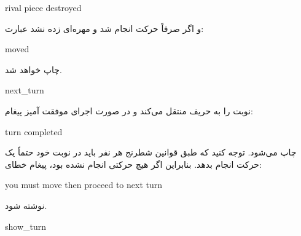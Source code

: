 \documentclass[]{article}
\begin{document}
\begin{tcolorbox}[boxrule=0pt]
	\begin{latin}
  	  \large{
  	  	rival piece destroyed
		}
	\end{latin}
\end{tcolorbox}

و اگر صرفاً حرکت انجام شد و مهره‌ای زده نشد عبارت:


\begin{tcolorbox}[boxrule=0pt]
	\begin{latin}
  	  \large{
  	  	moved
		}
	\end{latin}
\end{tcolorbox}

چاپ خواهد شد.

\hrulefill



\begin{tcolorbox}[boxrule=0pt]
	\begin{latin}
  	  \large{
  	  	next\_turn
		}
	\end{latin}
\end{tcolorbox}

نوبت را به حریف منتقل می‌کند و در صورت اجرای موفقت آمیز پیغام:



\begin{tcolorbox}[boxrule=0pt]
	\begin{latin}
  	  \large{
  	  	turn completed
		}
	\end{latin}
\end{tcolorbox}

چاپ می‌شود. توجه کنید که طبق قوانین شطرنج هر نفر باید در نوبت خود حتماً یک حرکت انجام بدهد. بنابراین اگر هیچ حرکتی انجام نشده بود، پیغام خطای:



\begin{tcolorbox}[boxrule=0pt]
	\begin{latin}
  	  \large{
  	  	you must move then proceed to next turn
		}
	\end{latin}
\end{tcolorbox}

نوشته شود.

\hrulefill



\begin{tcolorbox}[boxrule=0pt]
	\begin{latin}
  	  \large{
  	  	show\_turn
		}
	\end{latin}
\end{tcolorbox}
\end{document}
